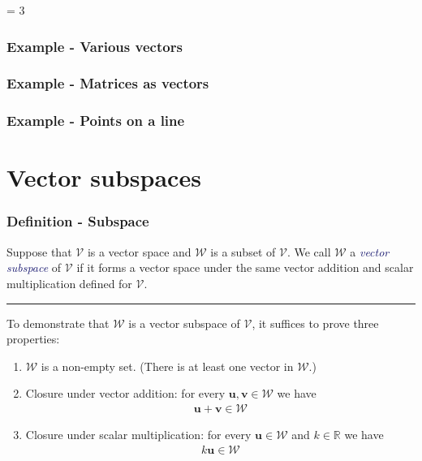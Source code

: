 \documentclass[usenames,dvipsnames,aspectratio=169,10pt]{beamer}
\def \EXAMPLEVERSION {1} %
\numberwithin{equation}{section}
\begin{document}
\ifnum \EXAMPLEVERSION = 3
\begin{frame}
\frametitle{Example - Various vectors}
\end{frame}

\begin{frame}
\frametitle{Example - Matrices as vectors}
\end{frame}

\begin{frame}
\frametitle{Example - Points on a line}
\end{frame}
\fi

\section{Vector subspaces}


\begin{frame}
\frametitle{Definition - Subspace}

Suppose that $\mathcal{V}$ is a vector space and $\mathcal{W}$ is a subset of $\mathcal{V}$. We call $\mathcal{W}$ a \textcolor{MidnightBlue}{\textit{vector subspace}} of $\mathcal{V}$ if it forms a vector space under the same vector addition and scalar multiplication defined for $\mathcal{V}$.
\vspace{-0.4cm}\begin{center} \textcolor{airforceblue}{\rule{0.7\textwidth}{0.3mm}} \end{center}\vspace{-0.2cm}

To demonstrate that $\mathcal{W}$ is a vector subspace of $\mathcal{V}$, it suffices to prove three properties:
\begin{enumerate}
\item $\mathcal{W}$ is a non-empty set. (There is at least one vector in $\mathcal{W}$.)

\item Closure under vector addition: for every $\textbf{u},\textbf{v}\in \mathcal{W}$ we have 
\begin{align*}
\textbf{u} + \textbf{v} \in \mathcal{W}
\end{align*}

\item Closure under scalar multiplication: for every $\textbf{u}\in\mathcal{W}$ and $k\in\mathbb{R}$ we have
\begin{align*}
k\textbf{u} \in \mathcal{W}
\end{align*}
\end{enumerate}
\end{frame}
\end{document}
